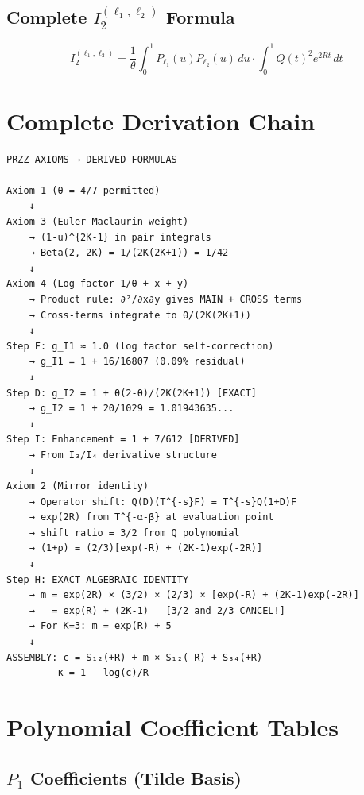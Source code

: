 \documentclass[11pt]{article}
\begin{document}
\subsection{Complete $I_2^{(\ell_1,\ell_2)}$ Formula}

\begin{equation}
I_2^{(\ell_1,\ell_2)} = \frac{1}{\theta} \int_0^1 P_{\ell_1}(u) P_{\ell_2}(u) \, du \cdot \int_0^1 Q(t)^2 e^{2Rt} \, dt
\end{equation}

\section{Complete Derivation Chain}
\label{app:chain}

\begin{verbatim}
PRZZ AXIOMS → DERIVED FORMULAS

Axiom 1 (θ = 4/7 permitted)
    ↓
Axiom 3 (Euler-Maclaurin weight)
    → (1-u)^{2K-1} in pair integrals
    → Beta(2, 2K) = 1/(2K(2K+1)) = 1/42
    ↓
Axiom 4 (Log factor 1/θ + x + y)
    → Product rule: ∂²/∂x∂y gives MAIN + CROSS terms
    → Cross-terms integrate to θ/(2K(2K+1))
    ↓
Step F: g_I1 ≈ 1.0 (log factor self-correction)
    → g_I1 = 1 + 16/16807 (0.09% residual)
    ↓
Step D: g_I2 = 1 + θ(2-θ)/(2K(2K+1)) [EXACT]
    → g_I2 = 1 + 20/1029 = 1.01943635...
    ↓
Step I: Enhancement = 1 + 7/612 [DERIVED]
    → From I₃/I₄ derivative structure
    ↓
Axiom 2 (Mirror identity)
    → Operator shift: Q(D)(T^{-s}F) = T^{-s}Q(1+D)F
    → exp(2R) from T^{-α-β} at evaluation point
    → shift_ratio = 3/2 from Q polynomial
    → (1+ρ) = (2/3)[exp(-R) + (2K-1)exp(-2R)]
    ↓
Step H: EXACT ALGEBRAIC IDENTITY
    → m = exp(2R) × (3/2) × (2/3) × [exp(-R) + (2K-1)exp(-2R)]
    →   = exp(R) + (2K-1)   [3/2 and 2/3 CANCEL!]
    → For K=3: m = exp(R) + 5
    ↓
ASSEMBLY: c = S₁₂(+R) + m × S₁₂(-R) + S₃₄(+R)
         κ = 1 - log(c)/R
\end{verbatim}

\section{Polynomial Coefficient Tables}
\label{app:coeffs}

\subsection{$P_1$ Coefficients (Tilde Basis)}
\end{document}
